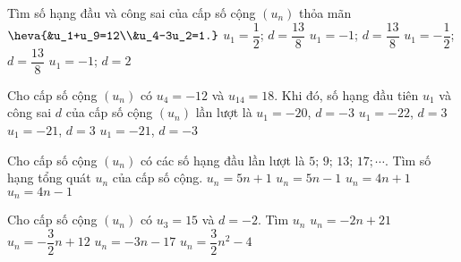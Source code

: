 \begin{ex}%
	Tìm số hạng đầu và công sai của cấp số cộng $(u_n)$ thỏa mãn $\heva{&u_1+u_9=12\\&u_4-3u_2=1.}$
	\choice
	{$u_1=\dfrac{1}{2}$; $d=\dfrac{13}{8}$}
	{$u_1=-1$; $d=\dfrac{13}{8}$}
	{\True $u_1=-\dfrac{1}{2}$; $d=\dfrac{13}{8}$}
	{$u_1=-1$; $d=2$}
\end{ex}

\begin{ex}%
	Cho cấp số cộng $(u_n)$ có $u_4=-12$ và $u_{14} =18$. Khi đó, số hạng đầu tiên $u_1$ và công sai $d$ của cấp số cộng $(u_n)$ lần lượt là
	\choice
	{$u_1=-20$, $d=-3$}
	{$u_1=-22$, $d=3$}
	{\True $u_1=-21$, $d=3$}
	{$u_1=-21$, $d=-3$}
\end{ex}

\begin{ex}%
	Cho cấp số cộng $(u_n )$ có các số hạng đầu lần lượt là $5;\,9;\,13;\,17;\cdots $. Tìm số hạng tổng quát $u_n$ của cấp số cộng.
	\choice
	{$u_n=5n+1$}
	{$u_n=5n-1$}
	{\True $u_n=4n+1$}
	{$u_n=4n-1$}
\end{ex}

\begin{ex}%
	Cho cấp số cộng $(u_n)$ có $u_3=15$ và $d=-2$. Tìm $u_n$
	\choice
	{\True $u_n=-2n+21$}
	{$u_n=-\dfrac{3}{2}n+12$}
	{$u_n=-3n-17$}
	{$u_n=\dfrac{3}{2}{{n}^2}-4$}
\end{ex}

